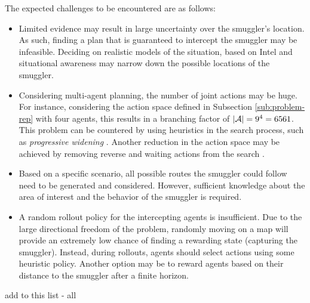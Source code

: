 \documentclass[conference]{IEEEtran}
\begin{document}
The expected challenges to be encountered are as follows:
\begin{itemize}
\item Limited evidence may result in large uncertainty over the smuggler's location. As such, finding a plan that is guaranteed to intercept the smuggler may be infeasible. Deciding on realistic models of the situation, based on Intel and situational awareness may narrow down the possible locations of the smuggler.
\item Considering multi-agent planning, the number of joint actions may be huge. For instance, considering the action space defined in Subsection \ref{sub:problem-rep} with four agents, this results in a branching factor of $\left\vert{\mathcal{A}}\right\vert  = 9^4 = 6561$. This problem can be countered by using heuristics in the search process, such as \emph{progressive widening} \cite{chaslot2008progressive}. Another reduction in the action space may be achieved by removing reverse and waiting actions from the search \cite{realtime2014}.
\item Based on a specific scenario, all possible routes the smuggler could follow need to be generated and considered. However, sufficient knowledge about the area of interest and the behavior of the smuggler is required.
\item A random rollout policy for the intercepting agents is insufficient. Due to the large directional freedom of the problem, randomly moving on a map will provide an extremely low chance of finding a rewarding state (\ie capturing the smuggler). Instead, during rollouts, agents should select actions using some heuristic policy. Another option may be to reward agents based on their distance to the smuggler after a finite horizon.
\end{itemize}
{\red add to this list - all}





\end{document}
